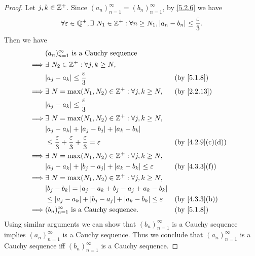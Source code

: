 \begin{proof}
  Let \(j, k \in \mathbb{Z}^+\).
  Since \((a_n)_{n = 1}^\infty = (b_n)_{n = 1}^\infty\), by \cref{5.2.6} we have
  \[
    \forall \varepsilon \in \mathbb{Q}^+, \exists\ N_1 \in \mathbb{Z}^+ : \forall n \geq N_1, \left\lvert a_n - b_n\right\rvert \leq \dfrac{\varepsilon}{3}.
  \]
  Then we have
  \begin{align*}
             & (a_n)_{n = 1}^\infty \text{ is a Cauchy sequence}                                                                               \\
    \implies & \exists\ N_2 \in \Z^+ : \forall j, k \geq N,                                                                                    \\
             & \abs{a_j - a_k} \leq \dfrac{\varepsilon}{3}                                                 &  & \by{5.1.8}                     \\
    \implies & \exists\ N = \max(N_1, N_2) \in \Z^+ : \forall j, k \geq N,                                 &  & \text{(by \cref{2.2.13})}      \\
             & \abs{a_j - a_k} \leq \dfrac{\varepsilon}{3}                                                                                     \\
    \implies & \exists\ N = \max(N_1, N_2) \in \Z^+ : \forall j, k \geq N,                                                                     \\
             & \abs{a_j - a_k} + \abs{a_j - b_j} + \abs{a_k - b_k}                                                                             \\
             & \leq \dfrac{\varepsilon}{3} + \dfrac{\varepsilon}{3} + \dfrac{\varepsilon}{3} = \varepsilon &  & \text{(by \cref{4.2.9}(c)(d))} \\
    \implies & \exists\ N = \max(N_1, N_2) \in \Z^+ : \forall j, k \geq N,                                                                     \\
             & \abs{a_j - a_k} + \abs{b_j - a_j} + \abs{a_k - b_k} \leq \varepsilon                        &  & \text{(by \cref{4.3.3}(f))}    \\
    \implies & \exists\ N = \max(N_1, N_2) \in \Z^+ : \forall j, k \geq N,                                                                     \\
             & \abs{b_j - b_k} = \abs{a_j - a_k + b_j - a_j + a_k - b_k}                                                                       \\
             & \leq \abs{a_j - a_k} + \abs{b_j - a_j} + \abs{a_k - b_k} \leq \varepsilon                   &  & \text{(by \cref{4.3.3}(b))}    \\
    \implies & (b_n)_{n = 1}^\infty \text{ is a Cauchy sequence}.                                          &  & \by{5.1.8}
  \end{align*}
  Using similar arguments we can show that \((b_n)_{n = 1}^\infty\) is a Cauchy sequence implies \((a_n)_{n = 1}^\infty\) is a Cauchy sequence.
  Thus we conclude that \((a_n)_{n = 1}^\infty\) is a Cauchy sequence iff \((b_n)_{n = 1}^\infty\) is a Cauchy sequence.
\end{proof}

